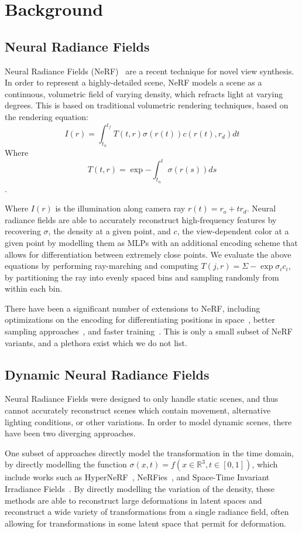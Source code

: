 \section*{Background}

\subsection*{Neural Radiance Fields}

Neural Radiance Fields (NeRF)~\cite{mildenhall2020nerf} are a recent technique for novel view synthesis. In order to represent a highly-detailed scene, NeRF models a scene as a continuous, volumetric field of varying density, which refracts light at varying degrees. This is based on traditional volumetric rendering techniques, based on the rendering equation:
\[
  I(r) = \int_{t_n}^{t_f} T(t, r) \sigma(r(t)) c(r(t), r_d)dt
\]
Where 
\[
    T(t, r) = \exp{-\int_{t_n}^{t} \sigma(r(s))ds}
\].

Where $I(r)$ is the illumination along camera ray $r(t) = r_o + t r_d$. Neural radiance fields are able to accurately reconstruct high-frequency features by recovering $\sigma$, the density at a given point, and $c$, the view-dependent color at a given point by modelling them as MLPs with an additional encoding scheme that allows for differentiation between extremely close points. We evaluate the above equations by performing ray-marching and computing $T(j,r) = \Sigma -\exp\sigma_i c_i$, by partitioning the ray into evenly spaced bins and sampling randomly from within each bin.

There have been a significant number of extensions to NeRF, including optimizations on the encoding for differentiating positions in space~\cite{tancik2020fourfeat}, better sampling approaches~\cite{barron2021mipnerf}, and faster training~\cite{yu2021plenoxels}. This is only a small subset of NeRF variants, and a plethora exist which we do not list.

\subsection*{Dynamic Neural Radiance Fields}

Neural Radiance Fields were designed to only handle static scenes, and thus cannot accurately reconstruct scenes which contain movement, alternative lighting conditions, or other variations.
In order to model dynamic scenes, there have been two diverging approaches. 

One subset of approaches directly model the transformation in the time domain, by directly modelling the function $\sigma(x,t)=f(x\in\mathbb{R}^3, t\in[0,1])$, which include works such as HyperNeRF~\cite{park2021hypernerf}, NeRFies~\cite{park2021nerfies}, and Space-Time Invariant Irradiance Fields~\cite{xian2021space}. By directly modelling the variation of the density, these methods are able to reconstruct large deformations in latent spaces and reconstruct a wide variety of transformations from a single radiance field, often allowing for transformations in some latent space that permit for deformation.

